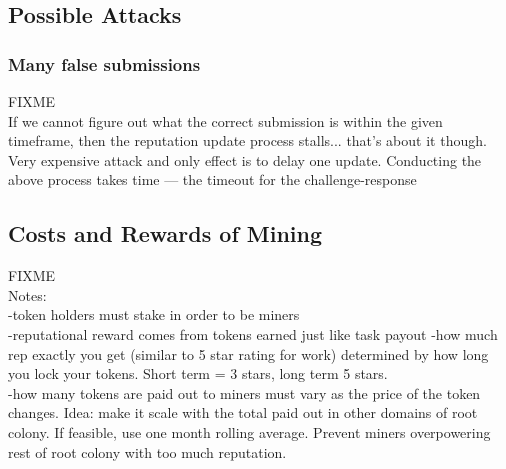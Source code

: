 \subsection{Possible Attacks}
\subsubsection*{Many false submissions}
FIXME\\ If we cannot figure out what the correct submission is within the given timeframe, then the reputation update process stalls... that's about it though. Very expensive attack and only effect is to delay one update.
Conducting the above process takes time --- the timeout for the challenge-response


\subsection{Costs and Rewards of Mining}\label{subsec:mining-costs-and-rewards}
FIXME\\
Notes:\\
-token holders must stake in order to be miners\\
-reputational reward comes from tokens earned just like task payout
-how much rep exactly you get (similar to 5 star rating for work) determined by how long you lock your tokens. Short term = 3 stars, long term 5 stars.\\
-how many tokens are paid out to miners must vary as the price of the token changes. Idea: make it scale with the total paid out in other domains of root colony. If feasible, use one month rolling average. Prevent miners overpowering rest of root colony with too much reputation.
